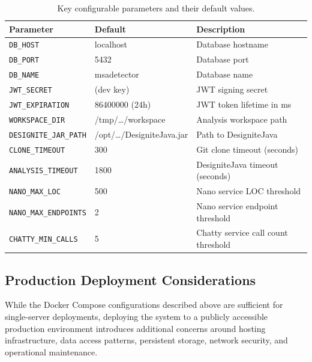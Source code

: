 \begin{table}[htbp]
    \centering
    \footnotesize
    \begin{tabular}{|l|l|p{4.5cm}|}
        \hline
        \textbf{Parameter} & \textbf{Default} & \textbf{Description} \\
        \hline\hline
        \texttt{DB\_HOST} & localhost & Database hostname \\
        \hline
        \texttt{DB\_PORT} & 5432 & Database port \\
        \hline
        \texttt{DB\_NAME} & msadetector & Database name \\
        \hline
        \texttt{JWT\_SECRET} & (dev key) & JWT signing secret \\
        \hline
        \texttt{JWT\_EXPIRATION} & 86400000 (24h) & JWT token lifetime in ms \\
        \hline
        \texttt{WORKSPACE\_DIR} & /tmp/\ldots/workspace & Analysis workspace path \\
        \hline
        \texttt{DESIGNITE\_JAR\_PATH} & /opt/\ldots/DesigniteJava.jar & Path to DesigniteJava \\
        \hline
        \texttt{CLONE\_TIMEOUT} & 300 & Git clone timeout (seconds) \\
        \hline
        \texttt{ANALYSIS\_TIMEOUT} & 1800 & DesigniteJava timeout (seconds) \\
        \hline
        \texttt{NANO\_MAX\_LOC} & 500 & Nano service LOC threshold \\
        \hline
        \texttt{NANO\_MAX\_ENDPOINTS} & 2 & Nano service endpoint threshold \\
        \hline
        \texttt{CHATTY\_MIN\_CALLS} & 5 & Chatty service call count threshold \\
        \hline
    \end{tabular}
    \caption{Key configurable parameters and their default values.}
    \label{tab:config-params}
\end{table}

\subsection{Production Deployment Considerations}
\label{subsec:prod-deployment}

 \par While the Docker Compose configurations described above are sufficient for single-server deployments, deploying the system to a publicly accessible production environment introduces additional concerns around hosting infrastructure, data access patterns, persistent storage, network security, and operational maintenance.

